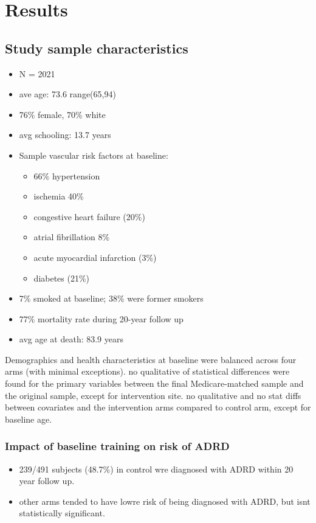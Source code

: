 \documentclass[11pt]{article}
\begin{document}
\section{Results}
\label{sec:org2794a3a}

\subsection{Study sample characteristics}
\label{sec:org3ec7647}

\begin{itemize}
\item N = 2021
\item ave age: 73.6 range(65,94)
\item 76\% female, 70\% white
\item avg schooling: 13.7 years
\item Sample vascular risk factors at baseline:
\begin{itemize}
\item 66\% hypertension
\item ischemia 40\%
\item congestive heart failure (20\%)
\item atrial fibrillation 8\%
\item acute myocardial infarction (3\%)
\item diabetes (21\%)
\end{itemize}
\item 7\% smoked at baseline; 38\% were former smokers
\item 77\% mortality rate during 20-year follow up
\item avg age at death: 83.9 years
\end{itemize}

Demographics and health characteristics at baseline were balanced across four arms (with minimal exceptions). no qualitative of statistical differences were found for the primary variables between the final Medicare-matched sample and the original sample, except for intervention site. no qualitative and no stat diffs between covariates and the intervention arms compared to control arm, except for baseline age.

\subsubsection{Impact of baseline training on risk of ADRD}
\label{sec:orgc3e5a6d}
\begin{itemize}
\item 239/491 subjects (48.7\%) in control wre diagnosed with ADRD within 20 year follow up.
\item other arms tended to have lowre risk of being diagnosed with ADRD, but isnt statistically significant.
\end{itemize}
\end{document}
